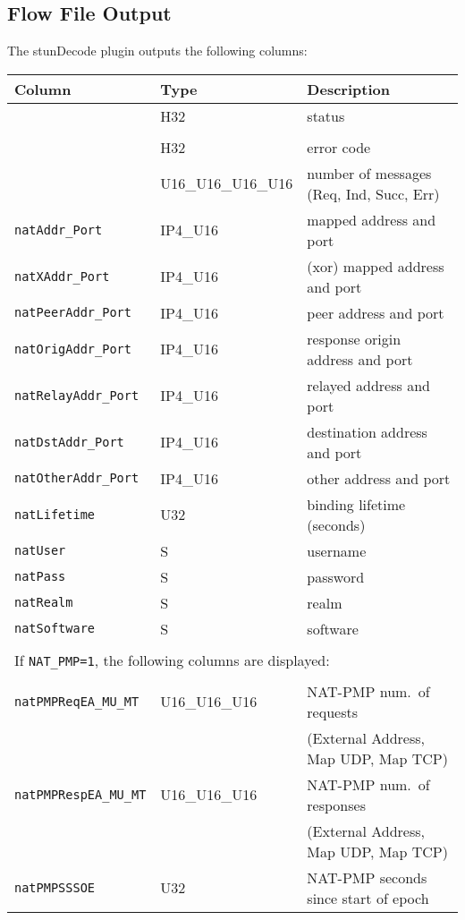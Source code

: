 \documentclass[documentation]{subfiles}
\begin{document}
\subsection{Flow File Output}
The stunDecode plugin outputs the following columns:
\begin{longtable}{lll}
    \toprule
    {\bf Column} & {\bf Type} & {\bf Description}\\
    \midrule\endhead%
    {\tt \nameref{natStat}}            & H32                & status\\\\
    {\tt \nameref{natErr}}             & H32                & error code\\
    {\tt \nameref{natMCReqIndSuccErr}} & U16\_U16\_U16\_U16 & number of messages (Req, Ind, Succ, Err)\\
    {\tt natAddr\_Port}                & IP4\_U16           & mapped address and port\\
    {\tt natXAddr\_Port}               & IP4\_U16           & (xor) mapped address and port\\
    {\tt natPeerAddr\_Port}            & IP4\_U16           & peer address and port\\
    {\tt natOrigAddr\_Port}            & IP4\_U16           & response origin address and port\\
    {\tt natRelayAddr\_Port}           & IP4\_U16           & relayed address and port\\
    {\tt natDstAddr\_Port}             & IP4\_U16           & destination address and port\\
    {\tt natOtherAddr\_Port}           & IP4\_U16           & other address and port\\
    {\tt natLifetime}                  & U32                & binding lifetime (seconds)\\
    {\tt natUser}                      & S                  & username\\
    {\tt natPass}                      & S                  & password\\
    {\tt natRealm}                     & S                  & realm\\
    {\tt natSoftware}                  & S                  & software\\
    \\
    \multicolumn{3}{l}{If {\tt NAT\_PMP=1}, the following columns are displayed:}\\
    \\
    {\tt natPMPReqEA\_MU\_MT }         & U16\_U16\_U16      & NAT-PMP num.\ of requests\\
                                       &                    & (External Address, Map UDP, Map TCP)\\
    {\tt natPMPRespEA\_MU\_MT}         & U16\_U16\_U16      & NAT-PMP num.\ of responses\\
                                       &                    & (External Address, Map UDP, Map TCP)\\
    {\tt natPMPSSSOE}                  & U32                & NAT-PMP seconds since start of epoch\\
    \bottomrule
\end{longtable}
\end{document}
